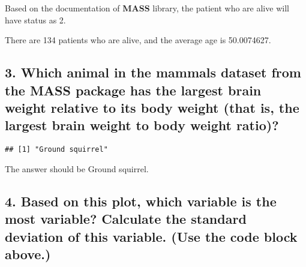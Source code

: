 \documentclass[
]{article}
\newenvironment{Shaded}{\begin{snugshade}}{\end{snugshade}}
\newcommand{\DecValTok}[1]{\textcolor[rgb]{0.00,0.00,0.81}{#1}}
\newcommand{\FunctionTok}[1]{\textcolor[rgb]{0.00,0.00,0.00}{#1}}
\newcommand{\NormalTok}[1]{#1}
\newcommand{\OtherTok}[1]{\textcolor[rgb]{0.56,0.35,0.01}{#1}}
\newcommand{\SpecialCharTok}[1]{\textcolor[rgb]{0.00,0.00,0.00}{#1}}
\begin{document}
Based on the documentation of \textbf{MASS} library, the patient who are
alive will have status as 2.

\begin{Shaded}
\end{Shaded}

There are 134 patients who are alive, and the average age is 50.0074627.

\hypertarget{which-animal-in-the-mammals-dataset-from-the-mass-package-has-the-largest-brain-weight-relative-to-its-body-weight-that-is-the-largest-brain-weight-to-body-weight-ratio}{%
\subsection{3. Which animal in the mammals dataset from the MASS package
has the largest brain weight relative to its body weight (that is, the
largest brain weight to body weight
ratio)?}\label{which-animal-in-the-mammals-dataset-from-the-mass-package-has-the-largest-brain-weight-relative-to-its-body-weight-that-is-the-largest-brain-weight-to-body-weight-ratio}}

\begin{Shaded}
\end{Shaded}

\begin{verbatim}
## [1] "Ground squirrel"
\end{verbatim}

The answer should be Ground squirrel.

\hypertarget{based-on-this-plot-which-variable-is-the-most-variable-calculate-the-standard-deviation-of-this-variable.-use-the-code-block-above.}{%
\subsection{4. Based on this plot, which variable is the most variable?
Calculate the standard deviation of this variable. (Use the code block
above.)}\label{based-on-this-plot-which-variable-is-the-most-variable-calculate-the-standard-deviation-of-this-variable.-use-the-code-block-above.}}
\end{document}
